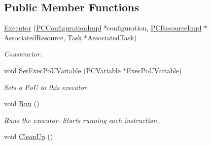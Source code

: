 \subsection*{Public Member Functions}
\begin{DoxyCompactItemize}
\item 
\hyperlink{classpc__emulator_1_1Executor_a55e78f5999c4ba3648a66927426a51d0}{Executor} (\hyperlink{classpc__emulator_1_1PCConfigurationImpl}{P\+C\+Configuration\+Impl} $\ast$configuration, \hyperlink{classpc__emulator_1_1PCResourceImpl}{P\+C\+Resource\+Impl} $\ast$Associated\+Resource, \hyperlink{classpc__emulator_1_1Task}{Task} $\ast$Associated\+Task)\hypertarget{classpc__emulator_1_1Executor_a55e78f5999c4ba3648a66927426a51d0}{}\label{classpc__emulator_1_1Executor_a55e78f5999c4ba3648a66927426a51d0}

\begin{DoxyCompactList}\small\item\em Constructor. \end{DoxyCompactList}\item 
void \hyperlink{classpc__emulator_1_1Executor_a2dbf56b19f3fbaf775f7b33b50ec8de9}{Set\+Exec\+Po\+U\+Variable} (\hyperlink{classpc__emulator_1_1PCVariable}{P\+C\+Variable} $\ast$Exec\+Po\+U\+Variable)
\begin{DoxyCompactList}\small\item\em Sets a PoU to this executor. \end{DoxyCompactList}\item 
void \hyperlink{classpc__emulator_1_1Executor_a2fd64c8278fe4cb4b3040c1f1cc0c874}{Run} ()\hypertarget{classpc__emulator_1_1Executor_a2fd64c8278fe4cb4b3040c1f1cc0c874}{}\label{classpc__emulator_1_1Executor_a2fd64c8278fe4cb4b3040c1f1cc0c874}

\begin{DoxyCompactList}\small\item\em Runs the executor. Starts running each instruction. \end{DoxyCompactList}\item 
void \hyperlink{classpc__emulator_1_1Executor_a8bbf346063821d7a9c5e9b734f29a70f}{Clean\+Up} ()\hypertarget{classpc__emulator_1_1Executor_a8bbf346063821d7a9c5e9b734f29a70f}{}\label{classpc__emulator_1_1Executor_a8bbf346063821d7a9c5e9b734f29a70f}


\end{DoxyCompactItemize}
